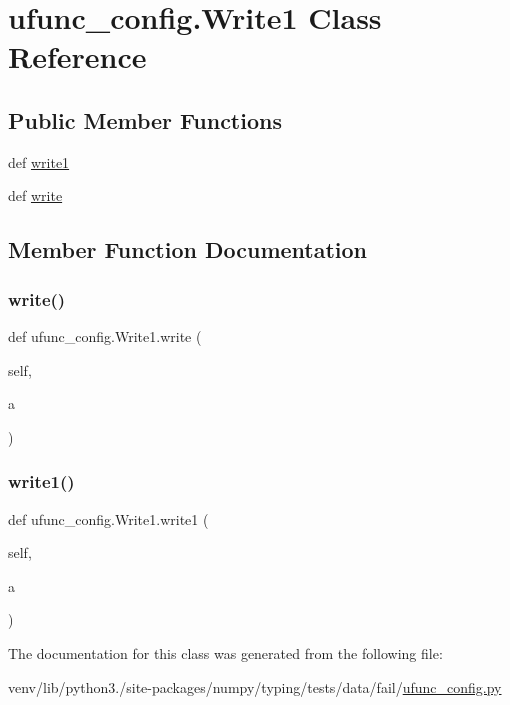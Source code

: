 \hypertarget{classufunc__config_1_1Write1}{}\section{ufunc\+\_\+config.\+Write1 Class Reference}
\label{classufunc__config_1_1Write1}
\subsection*{Public Member Functions}
\begin{DoxyCompactItemize}
\item 
def \hyperlink{classufunc__config_1_1Write1_aa9ac738cb61074e4b269f49b3ed4bb6b}{write1}
\item 
def \hyperlink{classufunc__config_1_1Write1_af16bf69c2722b21760102aac49161261}{write}
\end{DoxyCompactItemize}


\subsection{Member Function Documentation}
\mbox{\label{classufunc__config_1_1Write1_af16bf69c2722b21760102aac49161261}} 
\subsubsection{\texorpdfstring{write()}{write()}}
{\footnotesize\ttfamily def ufunc\+\_\+config.\+Write1.\+write (\begin{DoxyParamCaption}\item[{}]{self,  }\item[{}]{a }\end{DoxyParamCaption})}

\mbox{\label{classufunc__config_1_1Write1_aa9ac738cb61074e4b269f49b3ed4bb6b}} 
\subsubsection{\texorpdfstring{write1()}{write1()}}
{\footnotesize\ttfamily def ufunc\+\_\+config.\+Write1.\+write1 (\begin{DoxyParamCaption}\item[{}]{self,  }\item[{}]{a }\end{DoxyParamCaption})}



The documentation for this class was generated from the following file\+:\begin{DoxyCompactItemize}
\item 
venv/lib/python3./site-\/packages/numpy/typing/tests/data/fail/\hyperlink{fail_2ufunc__config_8py}{ufunc\+\_\+config.\+py}\end{DoxyCompactItemize}
